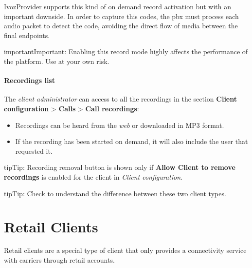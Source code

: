 \documentclass[letterpaper,10pt,english]{sphinxmanual}
\begin{document}
IvozProvider supports this kind of on demand record activation but with an
important downside. In order to capture this codes, the pbx must process each
audio packet to detect the code, avoiding the direct flow of media between the
final endpoints.

\begin{notice}{important}{Important:}
Enabling this record mode highly affects the performance of the
platform. Use at your own risk.
\end{notice}


\paragraph{Recordings list}
\label{administration_portal/client/residential/calls/call_recordings:recordings-list}
The \emph{client administrator} can access to all the recordings in the section
\textbf{Client configuration} \textgreater{} \textbf{Calls} \textgreater{} \textbf{Call recordings}:
\begin{itemize}
\item {} 
Recordings can be heard from the \emph{web} or downloaded in MP3 format.

\item {} 
If the recording has been started on demand, it will also include the user
that requested it.

\end{itemize}

\begin{notice}{tip}{Tip:}
Recording removal button is shown only if \textbf{Allow Client to remove recordings} is enabled
for the client in \emph{Client configuration}.
\end{notice}

\begin{notice}{tip}{Tip:}
Check {\hyperref[administration_portal/brand/clients/retail:differences\string-between\string-retail\string-and\string-residential\string-clients]{}} to understand the difference between these two
client types.
\end{notice}
\label{administration_portal/client/retail/index:retail-clients}

\section{Retail Clients}
\label{administration_portal/client/retail/index:retail-clients}\label{administration_portal/client/retail/index:clientes-retail}\label{administration_portal/client/retail/index::doc}\label{administration_portal/client/retail/index:id1}
Retail clients are a special type of client that only provides a connectivity
service with carriers through retail accounts.
\end{document}
